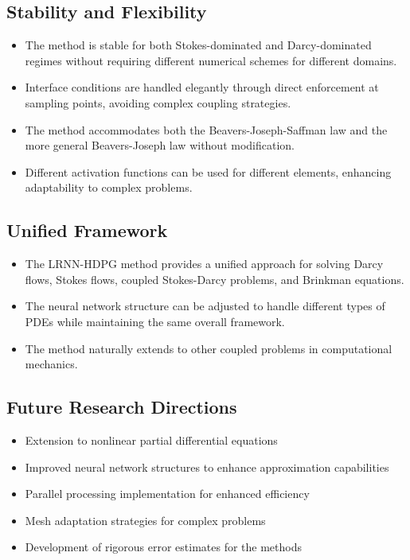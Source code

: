 \documentclass[11pt,a4paper]{article}
\begin{document}
\subsection{Stability and Flexibility}

\begin{itemize}
    \item The method is stable for both Stokes-dominated and Darcy-dominated regimes without requiring different numerical schemes for different domains.
    \item Interface conditions are handled elegantly through direct enforcement at sampling points, avoiding complex coupling strategies.
    \item The method accommodates both the Beavers-Joseph-Saffman law and the more general Beavers-Joseph law without modification.
    \item Different activation functions can be used for different elements, enhancing adaptability to complex problems.
\end{itemize}

\subsection{Unified Framework}

\begin{itemize}
    \item The LRNN-HDPG method provides a unified approach for solving Darcy flows, Stokes flows, coupled Stokes-Darcy problems, and Brinkman equations.
    \item The neural network structure can be adjusted to handle different types of PDEs while maintaining the same overall framework.
    \item The method naturally extends to other coupled problems in computational mechanics.
\end{itemize}

\subsection{Future Research Directions}

\begin{itemize}
    \item Extension to nonlinear partial differential equations
    \item Improved neural network structures to enhance approximation capabilities
    \item Parallel processing implementation for enhanced efficiency
    \item Mesh adaptation strategies for complex problems
    \item Development of rigorous error estimates for the methods
\end{itemize}
\end{document}
